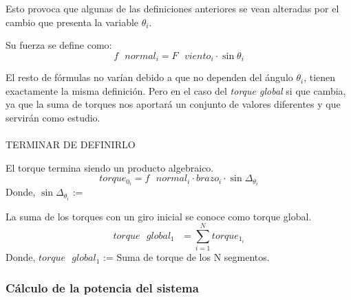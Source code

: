 Esto provoca que algunas de las definiciones anteriores se vean alteradas por el cambio que presenta la variable $\theta_i$.\\

 

 \begin{definicion}
  Su fuerza se define como:
  $$ f \text{ } normal_i = F \text{ } viento_i \cdot \sin{\theta_i}$$
  \label{def:fuerza_normal_torsion}
 \end{definicion}

El resto de fórmulas no varían debido a que no dependen del ángulo $\theta_i$, tienen exactamente la misma definición. Pero en el caso del \textit{torque global} si que cambia, ya que la suma de torques nos aportará un conjunto de valores diferentes y que servirán como estudio. \\\\


{\Large TERMINAR DE DEFINIRLO}
  \begin{definicion}
  El torque termina siendo un producto algebraico.
 $$ torque_0_{i} = f \text{ } normal_i \cdot brazo_i \cdot \sin{\Delta_{\theta_{i}}}$$
 Donde,
 \centering $\sin{\Delta_{\theta_{i}}}$ := 
 \label{def:torque_algebraico_torsion}
 \end{definicion}
 

\begin{definicion}
 La suma de los torques con un giro inicial se conoce como torque global.
 $$ torque \text{ } global_1 \text{ } = \sum_{i=1}^{N} torque_1_{i} $$
Donde,
\centering $torque \text{ } global_1$ := Suma de torque de los N segmentos.
 \label{def:torque_global_1}
\end{definicion}






















\subsubsection{Cálculo de la potencia del sistema}
 
